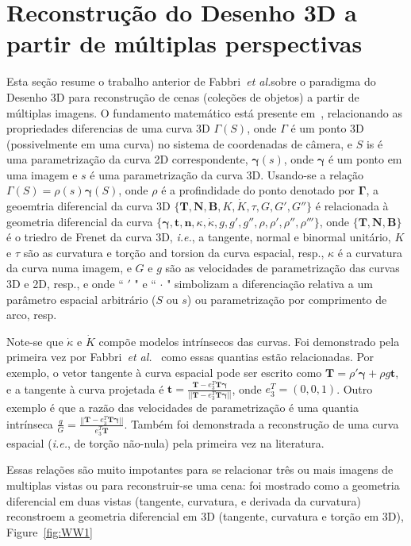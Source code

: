 \documentclass[a4paper,titlepage]{article}
\newcommand{\ie}{{\it i.e.}}
\newcommand{\etal}{{\it et al.}}
\newcommand{\Gama}{\boldsymbol{\Gamma}}
\newcommand{\gama}{\boldsymbol{\gamma}}
\begin{document}
\section{Reconstrução do Desenho 3D a partir de múltiplas perspectivas}
Esta seção resume o trabalho anterior de Fabbri~\etal sobre o paradigma do
Desenho 3D para reconstrução de cenas (coleções de objetos) a partir de múltiplas imagens.
O fundamento matemático está presente em~\cite{fabbri2016multiview},
relacionando as propriedades diferencias de uma curva 3D
$\Gamma(S)$, onde $\Gamma$ é um ponto 3D (possivelmente em uma curva) no sistema
de coordenadas de câmera, e $S$ is é uma parametrização da curva 2D
correspondente, $\gama(s)$, onde $\gama$ é um ponto em uma imagem e $s$ é uma
parametrização da curva 3D. Usando-se a relação
$\Gamma(S) = \rho(s) \gama(S)$, onde $\rho$ é a profindidade do ponto
denotado por $\Gama$, a geoemtria diferencial da curva 3D
$\{
\boldsymbol{T},\boldsymbol{N},\boldsymbol{B}, K, \dot{K},\tau, G,G',G''\}$ é
relacionada à geometria diferencial da curva 
$\{\boldsymbol{\gamma},
\boldsymbol{t}, \boldsymbol{n}, \kappa, \dot{\kappa}, g, g', g'',\rho,
\rho',\rho'',\rho'''\}$, onde
$\{\boldsymbol{T},\boldsymbol{N},\boldsymbol{B}\}$ é o triedro de Frenet da
curva 3D, \ie, a tangente, normal e binormal unitário, 
$K$ e $\tau$ são as curvatura e torção and torsion da curva espacial, resp.,
$\kappa$ é a curvatura da curva numa imagem, e $G$ e $g$ são as velocidades de
parametrização das curvas 3D e 2D, resp., e onde
`` $'$ " e `` $\cdot$ " simbolizam a diferenciação relativa a um parâmetro
espacial arbitrário ($S$ ou $s$) ou parametrização por comprimento de arco,
resp. 

Note-se que $\dot{\kappa}$ e $\dot{K}$ compõe modelos intrínsecos das curvas. 
Foi demonstrado pela primeira vez por Fabbri~\etal~\cite{fabbri2016multiview} como
essas quantias estão relacionadas. Por exemplo, o vetor tangente à curva
espacial pode ser escrito como 
$\boldsymbol{T}=\rho'\boldsymbol{\gamma}+\rho g \boldsymbol{t}$, e a tangente à
curva projetada é $\boldsymbol{t}=\frac{\boldsymbol{T}-e^T_3\boldsymbol{T}
\boldsymbol{\gamma}}{||\boldsymbol{T}-e^T_3\boldsymbol{T}
\boldsymbol{\gamma}||}$,  onde $e_3^T=(0,0,1)$. Outro exemplo é que a razão das
velocidades de parametrização é uma quantia intrínseca
$\frac{g}{G}=\frac{||\boldsymbol{T}-e^T_3\boldsymbol{T}
\boldsymbol{\gamma}||}{e^T_3\boldsymbol{T}}$. Também foi demonstrada a
reconstrução de uma curva espacial (\ie, de torção não-nula) pela primeira vez na literatura.


Essas relações são muito impotantes para se relacionar três ou mais imagens 
de multiplas vistas ou para reconstruir-se uma cena: foi mostrado como 
a geometria diferencial em duas vistas (tangente, curvatura, e
derivada da curvatura) reconstroem a geometria diferencial em 3D (tangente,
curvatura e torção em 3D), Figure~\ref{fig:WW1}
\end{document}
